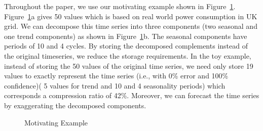 \documentclass[10pt,conference,letterpaper]{IEEEtran}
\begin{document}

Throughout the paper, we use our motivating example shown in Figure~\ref{fig:example}. 
Figure~\ref{fig:example}a gives 50 values which is based on  real world power consumption in UK grid. We can decompose this time series into three components (two seasonal  and one trend components)  as shown in Figure~\ref{fig:example}b. The seasonal components have periods of 10 and 4 cycles.
By storing the decomposed complements instead of the original timeseries,  we reduce the storage requirements. In the toy example, instead of storing the 50 values of the original time series, we need only  store 19 values to exactly represent the time series (i.e., with 0\% error and 100\% confidence)( 5 values for trend and 10 and 4 seasonality periods) which corresponds a compression ratio of 42\%. Moreover, we can forecast the time series by exaggerating the decomposed components.
\begin{figure}[th]
\center
{}
\caption{Motivating Example}
\label{fig:example}
\end{figure} 
\end{document}
